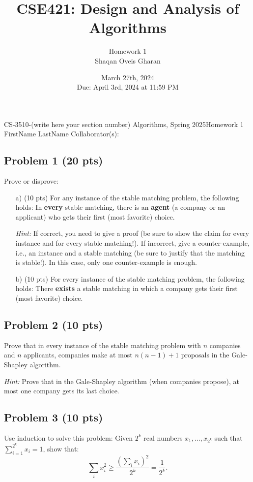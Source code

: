 \documentclass[12pt]{article}
\title{\textbf{CSE421: Design and Analysis of Algorithms}}
\author{Homework 1 \\ Shaqan Oveis Gharan}
\date{March 27th, 2024 \\ Due: April 3rd, 2024 at 11:59 PM}
\begin{document}
\noindent CS-3510-(write here your section number) Algorithms, Spring 2025\hfill Homework 1\\
FirstName LastName \hfill Collaborator(s):

\hrulefill

\subsection*{Problem 1 (20 pts)}

Prove or disprove:

\begin{enumerate}
    \item[a)] (10 pts) For any instance of the stable matching problem, the following holds: In \textbf{every} stable matching, there is an \textbf{agent} (a company or an applicant) who gets their first (most favorite) choice. 
    
    \textit{Hint:} If correct, you need to give a proof (be sure to show the claim for every instance and for every stable matching!). If incorrect, give a counter-example, i.e., an instance and a stable matching (be sure to justify that the matching is stable!). In this case, only one counter-example is enough.
    
    \item[b)] (10 pts) For every instance of the stable matching problem, the following holds: There \textbf{exists} a stable matching in which a company gets their first (most favorite) choice.
\end{enumerate}

\subsection*{Problem 2 (10 pts)}

Prove that in every instance of the stable matching problem with $n$ companies and $n$ applicants, companies make at most $n(n-1)+1$ proposals in the Gale-Shapley algorithm.

\textit{Hint:} Prove that in the Gale-Shapley algorithm (when companies propose), at most one company gets its last choice.

\subsection*{Problem 3 (10 pts)}

Use induction to solve this problem: Given $2^k$ real numbers $x_1, \ldots, x_{2^k}$ such that $\sum_{i=1}^{2^k} x_i = 1$, show that:
\[
\sum_{i} x_i^2 \geq \frac{\left(\sum_{i} x_i\right)^2}{2^k} = \frac{1}{2^k}.
\]
\end{document}
